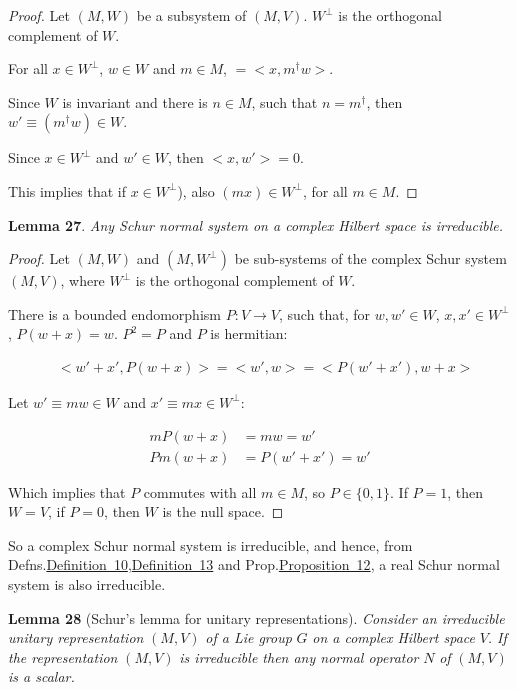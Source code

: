 \documentclass[11pt]{book}
\begin{document}
\emph{Proof.} Let \((M,W)\) be a subsystem of \((M,V)\). \(W^\bot\) is
the orthogonal complement of \(W\).

For all \(x\in W^\bot\), \(w\in W\) and \(m\in M\),
\(<m x, w>=<x,m^\dagger w>\).

Since \(W\) is invariant and there is \(n\in M\), such that
\(n=m^\dagger\), then \(w'\equiv (m^\dagger w)\in W\).

Since \(x\in W^\bot\) and \(w'\in W\), then \(<x, w'>=0\).

This implies that if \(x\in W^\bot\)), also \((m x)\in W^\bot\), for all
\(m\in M\).~◻

\textbf{Lemma 27}. \emph{Any Schur normal system on a complex Hilbert
space is irreducible.}

\emph{Proof.} Let \((M,W)\) and \((M,W^\bot)\) be sub-systems of the
complex Schur system \((M,V)\), where \(W^\bot\) is the orthogonal
complement of \(W\).

There is a bounded endomorphism \(P: V\to V\), such that, for
\(w,w'\in W\), \(x,x'\in W^\bot\), \(P(w+x)=w\). \(P^2=P\) and \(P\) is
hermitian:

\begin{equation}\begin{aligned}
&<w'+x',P (w+x)>=<w',w>=
<P(w'+x'),w+x>\end{aligned}\end{equation}

Let \(w'\equiv m w\in W\) and \(x'\equiv m x\in
W^\bot\):

\begin{equation}\begin{aligned}
m P(w+x)&=m w=w'\\
P m(w+x)&=P(w'+x')=w'\end{aligned}\end{equation}

Which implies that \(P\) commutes with all \(m\in M\), so
\(P\in\{0,1\}\). If \(P=1\), then \(W=V\), if \(P=0\), then \(W\) is the
null space.~◻

So a complex Schur normal system is irreducible, and hence, from
Defns.\protect\hyperlink{defn:Rsystem}{Definition~10},\protect\hyperlink{defn:schur}{Definition~13}
and Prop.\protect\hyperlink{prop:Rirreducible}{Proposition~12}, a real
Schur normal system is also irreducible.

\textbf{Lemma 28} (Schur's lemma for unitary
representations\cite{Ramakrishnan1999Fourier}). \emph{Consider an irreducible unitary
representation }\((M,V)\)\emph{ of a Lie group }\(G\)\emph{ on a complex
Hilbert space }\(V\)\emph{. If the representation }\((M,V)\)\emph{ is
irreducible then any normal operator }\(N\)\emph{ of }\((M,V)\)\emph{ is
a scalar.}
\end{document}
